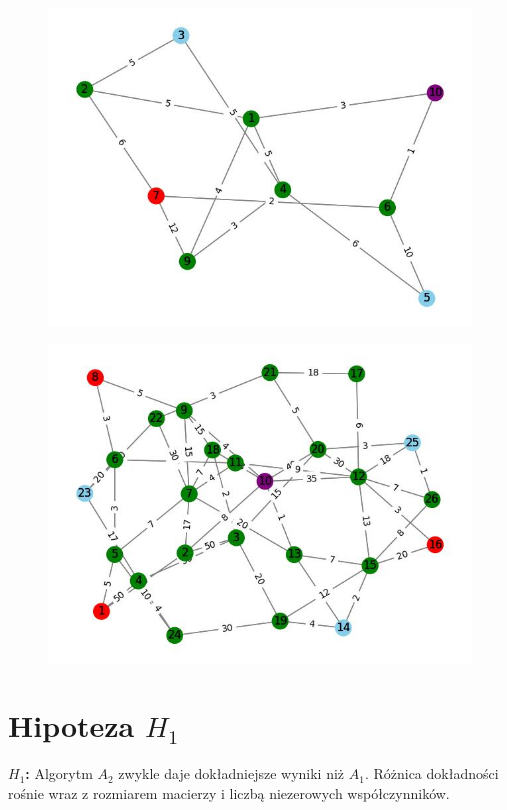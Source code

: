 \documentclass{article}
\begin{document}
\begin{figure}
    \centering
    \includegraphics[width=1\linewidth]{8.jpg}
    \label{fig:enter-label}
\end{figure}

\begin{figure}
    \centering
    \includegraphics[width=1\linewidth]{9.jpg}
    \label{fig:enter-label}
\end{figure}

\clearpage

\section{Hipoteza  $H_1$}
\textbf{$H_1$:} Algorytm  $A_2$ zwykle daje dokładniejsze wyniki niż $A_1$. Różnica dokładności rośnie wraz z rozmiarem macierzy i liczbą niezerowych współczynników.
\end{document}
